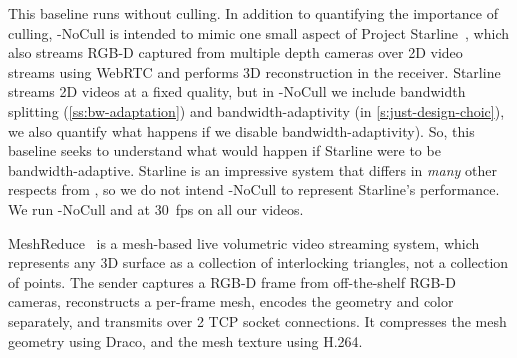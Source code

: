 
%
This baseline runs \livo without culling.
%
In addition to quantifying the importance of culling,
\livo-NoCull is intended to mimic one small aspect of Project Starline~\cite{starline}, which also streams RGB-D captured from multiple depth cameras over 2D video streams using WebRTC and performs 3D reconstruction in the receiver.
%
Starline streams 2D videos at a fixed quality, but in \livo-NoCull we include bandwidth splitting (\cref{ss:bw-adaptation}) and bandwidth-adaptivity (in \cref{s:just-design-choic}), we also quantify what happens if we disable bandwidth-adaptivity).
%
So, this baseline seeks to understand what would happen if Starline were to be bandwidth-adaptive.
%
Starline is an impressive system that differs in \textit{many} other respects from \livo, so we do not intend \livo-NoCull to represent Starline's performance.
%
%
We run \livo-NoCull and \livo at 30~fps on all our videos.

%
MeshReduce~\cite{meshreduce} is a mesh-based live volumetric video streaming system, which represents any 3D surface as a collection of interlocking triangles, not a collection of points.
%
The sender captures a RGB-D frame from off-the-shelf RGB-D cameras, reconstructs a per-frame mesh, encodes the geometry and color separately, and transmits over 2 TCP socket connections.
%
It compresses the mesh geometry using Draco, and the mesh texture using H.264.
%

